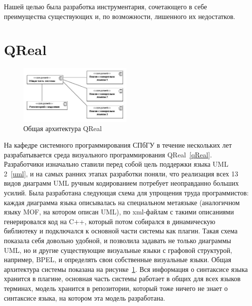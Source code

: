 \documentclass[a4paper]{article}
\begin{document}
Нашей целью была разработка инструментария, сочетающего в себе преимущества существующих и, по возможности, лишенного их недостатков.

\section{QReal}

\begin{figure}
  \begin{center}
    \includegraphics[width=0.5\textwidth]{architecture.jpg}
    \caption{Общая архитектура QReal}
    \label{architecture}
  \end{center}
\end{figure}

На кафедре системного программирования СПбГУ в течение нескольких лет разрабатывается среда визуального программирования QReal~\ref{qReal}. Разработчики изначально ставили перед собой цель поддержки языка UML 2~\ref{uml}, и на самых ранних этапах разработки поняли, что реализация всех 13 видов диаграмм UML ручным кодированием потребует неоправданно больших усилий. Была разработана следующая схема для упрощения труда программистов: каждая диаграмма языка описывалась на специальном метаязыке (аналогичном языку MOF, на котором описан UML), по xml-файлам с такими описаниями генерировался код на C++, который потом собирался в динамическую библиотеку и подключался к основной части системы как плагин. Такая схема показала себя довольно удобной, и позволила задавать не только диаграммы UML, но и другие существующие визуальные языки с графовой структурой, например, BPEL, и определять свои собственные визуальные языки. Общая архитектура системы показана на рисунке~\ref{architecture}. Вся информация о синтаксисе языка хранится в плагине, основная часть системы работает в общих для всех языков терминах, модель хранится в репозитории, который тоже ничего не знает о синтаксисе языка, на котором эта модель разработана.
\end{document}
